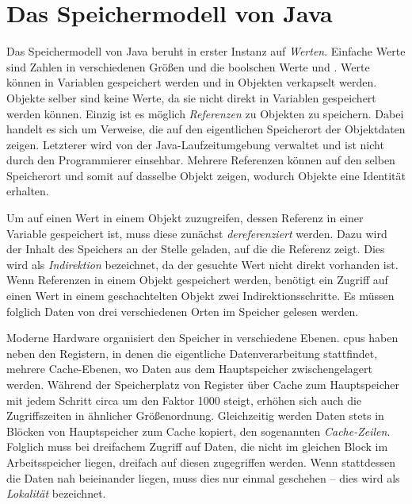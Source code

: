 \section{Das Speichermodell von Java}\label{sec:memory-model}

Das Speichermodell von Java beruht in erster Instanz auf \emph{Werten}.
Einfache Werte sind Zahlen in verschiedenen Größen und die boolschen Werte  und .
Werte können in Variablen gespeichert werden und in Objekten verkapselt werden.
Objekte selber sind keine Werte, da sie nicht direkt in Variablen gespeichert werden können.
Einzig ist es möglich \emph{Referenzen} zu Objekten zu speichern.
Dabei handelt es sich um Verweise, die auf den eigentlichen Speicherort der Objektdaten zeigen.
Letzterer wird von der Java-Laufzeitumgebung verwaltet und ist nicht durch den Programmierer einsehbar.
Mehrere Referenzen können auf den selben Speicherort und somit auf dasselbe Objekt zeigen, wodurch Objekte eine Identität erhalten.

Um auf einen Wert in einem Objekt zuzugreifen, dessen Referenz in einer Variable gespeichert ist, muss diese zunächst \emph{dereferenziert} werden.
Dazu wird der Inhalt des Speichers an der Stelle geladen, auf die die Referenz zeigt.
Dies wird als \emph{Indirektion} bezeichnet, da der gesuchte Wert nicht direkt vorhanden ist.
Wenn Referenzen in einem Objekt gespeichert werden, benötigt ein Zugriff auf einen Wert in einem geschachtelten Objekt zwei Indirektionsschritte.
Es müssen folglich Daten von drei verschiedenen Orten im Speicher gelesen werden.

Moderne Hardware organisiert den Speicher in verschiedene Ebenen.
\acp{cpu} haben neben den Registern, in denen die eigentliche Datenverarbeitung stattfindet, mehrere Cache-Ebenen, wo Daten aus dem Hauptspeicher zwischengelagert werden.
Während der Speicherplatz von Register über Cache zum Hauptspeicher mit jedem Schritt circa um den Faktor 1000 steigt, erhöhen sich auch die Zugriffszeiten in ähnlicher Größenordnung.
Gleichzeitig werden Daten stets in Blöcken von Hauptspeicher zum Cache kopiert, den sogenannten \emph{Cache-Zeilen}.
Folglich muss bei dreifachem Zugriff auf Daten, die nicht im gleichen Block im Arbeitsspeicher liegen, dreifach auf diesen zugegriffen werden.
Wenn stattdessen die Daten nah beieinander liegen, muss dies nur einmal geschehen -- dies wird als \emph{Lokalität} bezeichnet.

